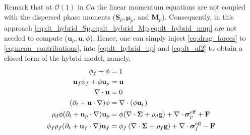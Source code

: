 Remark that at $\mathcal{O}(1)$ in $Ca$ the linear momentum equations are not coupled with the dispersed phase moments ($\textbf{S}_p,\bm\mu_p$, and $\textbf{M}_p$).  
Consequently, in this approach \ref{eq:dt_hybrid_Sp,eq:dt_hybrid_Mp,eq:dt_hybrid_mup} are not needed to compute ($\textbf{u}_p,\textbf{u},\phi$).
Hence, one can simply inject \ref{eq:drag_forces} to \ref{eq:mean_contributions}, into  \ref{eq:dt_hybrid_up} and \ref{eq:dt_uf2} to obtain a closed form of the hybrid model, namely,  
\begin{align}
    \label{eq:firstSys}
    \phi_f + \phi &= 1\\
    \textbf{u}_f\phi_f + 
    \phi\textbf{u}_p&=\textbf{u}\\
    \div \textbf{u} &= 0\\
    (\pddt + \textbf{u} \cdot \grad)\phi
    &=
    \div (\phi \textbf{u}_r)\\
    \rho_d \phi (\pddt + \textbf{u}_p \cdot \grad)\textbf{u}_p
    &=
    \phi(\div \bm\Sigma
    + \rho_d  \textbf{g})
    + \div \bm\sigma_p^\text{eff}
    + \textbf{F}
    \\
    \phi_f \rho_f(\pddt + \textbf{u}_f  \cdot \grad) \textbf{u}_f
    &= \phi_f 
    \left(\div \bm\Sigma
    + \rho_f \textbf{g}\right)
    + \div \bm\sigma_f^\text{eff}
    -\textbf{F}
    \label{eq:lastSys}
\end{align}
